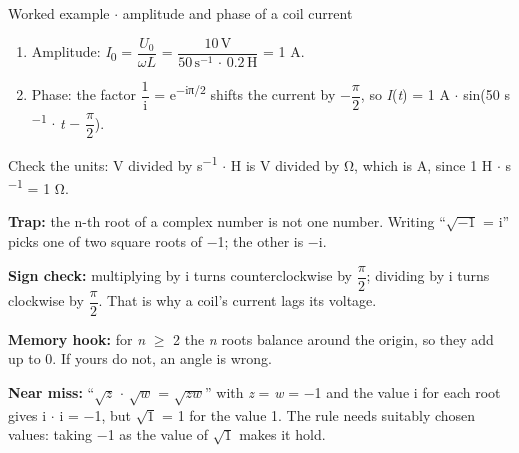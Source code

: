 \documentclass[11pt]{article}
\begin{document}
\begin{keepsection}
\begin{keepsection}
\begin{workedbox}{Worked example \ensuremath{\cdot} amplitude and phase of a coil current}
\begin{enumerate}
\item Amplitude: \textit{I}\textsubscript{0} = {\small\ensuremath{\dfrac{{U}_{0}}{ω{L}}}} = {\small\ensuremath{\dfrac{10\, \mathrm{V}}{50\, \mathrm{s}^{-1}\, \cdot \, 0.2\, \mathrm{H}}}} = 1 A.
\item Phase: the factor {\small\ensuremath{\dfrac{1}{\mathrm{i}}}} = e\textsuperscript{\ensuremath{-}iπ/2} shifts the current by \ensuremath{-}{\small\ensuremath{\dfrac{π}{2}}}, so \textit{I}(\textit{t}) = 1 A \ensuremath{\cdot} sin(50 s\textsuperscript{\ensuremath{-}1} \ensuremath{\cdot} \textit{t} \ensuremath{-} {\small\ensuremath{\dfrac{π}{2}}}).
\end{enumerate}

Check the units: V divided by s\textsuperscript{\ensuremath{-}1} \ensuremath{\cdot} H is V divided by Ω, which is A, since 1 H \ensuremath{\cdot} s\textsuperscript{\ensuremath{-}1} = 1 Ω.
\end{workedbox}

\begin{notebox}\textbf{Trap:} the n-th root of a complex number is not one number. Writing “\ensuremath{\sqrt{-1}} = i” picks one of two square roots of \ensuremath{-}1; the other is \ensuremath{-}i.\end{notebox}

\begin{notebox}\textbf{Sign check:} multiplying by i turns counterclockwise by {\small\ensuremath{\dfrac{π}{2}}}; dividing by i turns clockwise by {\small\ensuremath{\dfrac{π}{2}}}. That is why a coil’s current lags its voltage.\end{notebox}

\begin{notebox}\textbf{Memory hook:} for \textit{n} \ensuremath{\geq} 2 the \textit{n} roots balance around the origin, so they add up to 0. If yours do not, an angle is wrong.\end{notebox}

\begin{notebox}\textbf{Near miss:} “\ensuremath{\sqrt{{z}}} \ensuremath{\cdot} \ensuremath{\sqrt{{w}}} = \ensuremath{\sqrt{{z}{w}}}” with \textit{z} = \textit{w} = \ensuremath{-}1 and the value i for each root gives i \ensuremath{\cdot} i = \ensuremath{-}1, but \ensuremath{\sqrt{1}} = 1 for the value 1. The rule needs suitably chosen values: taking \ensuremath{-}1 as the value of \ensuremath{\sqrt{1}} makes it hold.\end{notebox}


\end{keepsection}
\end{keepsection}
\end{document}
